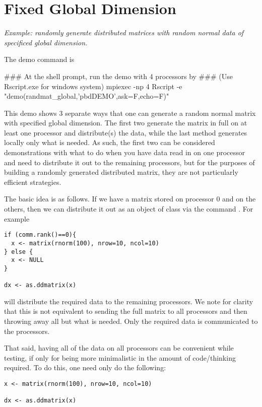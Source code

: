 \section{Fixed Global Dimension}\label{subsec:rng.gl}

\emph{Example:  randomly generate distributed matrices with random normal data of specificed global dimension.}

The demo command is
\begin{Command}
### At the shell prompt, run the demo with 4 processors by
### (Use Rscript.exe for windows system)
mpiexec -np 4 Rscript -e "demo(randmat_global,'pbdDEMO',ask=F,echo=F)"
\end{Command}

This demo shows 3 separate ways that one can generate a random normal matrix with specified global dimension.  The first two generate the matrix in full on at least one processor and distribute(s) the data, while the last method generates locally only what is needed.  As such, the first two can be considered demonstrations with what to do when you have data read in on one processor and need to distribute it out to the remaining processors, but for the purposes of building a randomly generated distributed matrix, they are not particularly efficient strategies.

The basic idea is as follows.  If we have a matrix  stored on processor 0 and  on the others, then we can distribute it out as an object of class  via the command .  For example
\begin{lstlisting}[language=rr]
if (comm.rank()==0){
  x <- matrix(rnorm(100), nrow=10, ncol=10)
} else {
  x <- NULL
}

dx <- as.ddmatrix(x)
\end{lstlisting}

will distribute the required data to the remaining processors.  We note for clarity that this is not equivalent to sending the full matrix to all processors and then throwing away all but what is needed.  Only the required data is communicated to the processors.

That said, having all of the data on all processors can be convenient while testing, if only for being more minimalistic in the amount of code/thinking required.  To do this, one need only do the following:

\begin{lstlisting}[language=rr]
x <- matrix(rnorm(100), nrow=10, ncol=10)

dx <- as.ddmatrix(x)
\end{lstlisting}

